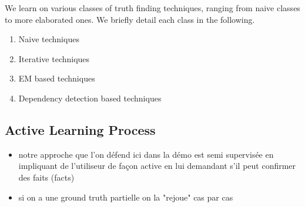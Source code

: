 We learn on various classes of truth finding techniques, ranging from naive classes to more elaborated ones. We
briefly detail each class in the following.
\begin{enumerate}
 \item Naive techniques
 \item Iterative techniques
 \item EM based techniques
 \item Dependency detection based techniques
\end{enumerate}



\subsection{Active Learning Process}
\begin{itemize}
 \item notre approche que l'on défend ici dans la démo est  semi supervisée en impliquant de l'utiliseur de façon active
en lui demandant s'il peut confirmer des faits (facts)
\item si on a une ground truth partielle on la "rejoue" cas par cas
\end{itemize}

